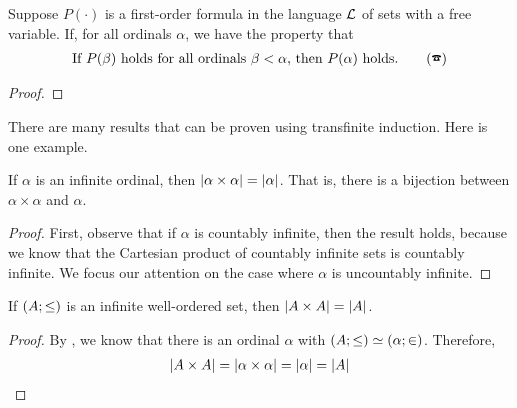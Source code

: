 \begin{boxtheorem}\label{Ch3:Thm:Transfinite_Induction}
    Suppose $P(\cdot)$ is a first-order formula in the language $\mathcal{L}$ of sets with a free variable. If, for all ordinals $\alpha$, we have the property that
    \begin{align}
        \text{If } P(\beta) \text{ holds for all ordinals } \beta < \alpha \text{, then } P(\alpha) \text{ holds.}
        \label{Ch3:Eq:Transfinite_Induction_Condition}
        \tag{\ding{37}}
    \end{align}
\end{boxtheorem}
\begin{proof}
    \sorry
\end{proof}

There are many results that can be proven using transfinite induction. Here is one example.

\begin{boxtheorem}
    If $\alpha$ is an infinite ordinal, then $\left\lvert \alpha \times \alpha \right\rvert = \left\lvert \alpha \right\rvert$. That is, there is a bijection between $\alpha \times \alpha$ and $\alpha$.
\end{boxtheorem}
\begin{proof}
    First, observe that if $\alpha$ is countably infinite, then the result holds, because we know that the Cartesian product of countably infinite sets is countably infinite. We focus our attention on the case where $\alpha$ is uncountably infinite.

    \sorry
\end{proof}

\begin{boxcorollary}
    If $\left( A; \le \right)$ is an infinite well-ordered set, then $\left\lvert A \times A \right\rvert = \left\lvert A \right\rvert$.
\end{boxcorollary}
\begin{proof}
    By \sorry, we know that there is an ordinal $\alpha$ with $\left( A; \le \right) \simeq \left( \alpha; \in \right)$. Therefore,
    \begin{align*}
        \left\lvert A \times A \right\rvert = \left\lvert \alpha \times \alpha \right\rvert = \left\lvert \alpha \right\rvert = \left\lvert A \right\rvert
    \end{align*}
\end{proof}
